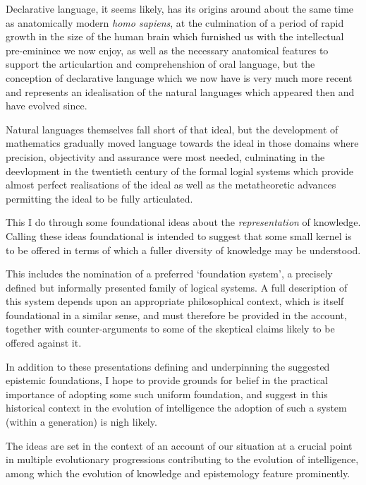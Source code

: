 Declarative language, it seems likely, has its origins around about the same time as anatomically modern \emph{homo sapiens}, at the culmination of a period of rapid growth in the size of the human brain which furnished us with the intellectual pre-eminince we now enjoy, as well as the necessary anatomical features to support the articulartion and comprehenshion of oral language, but the conception of declarative language which we now have is very much more recent and represents an idealisation of the natural languages which appeared then and have evolved since.

Natural languages themselves fall short of that ideal, but the development of mathematics gradually moved language towards the ideal in those domains where precision, objectivity and assurance were most needed, culminating in the deevlopment in the twentieth century of the formal logial systems which provide almost perfect realisations of the ideal as well as the metatheoretic advances permitting the ideal to be fully articulated. 

This I do through some foundational ideas about the \emph{representation} of knowledge.
Calling these ideas foundational is intended to suggest that some small kernel is to be offered in terms of which a fuller diversity of knowledge may be understood.

This includes the nomination of a preferred `foundation system', a precisely defined but informally presented family of logical systems.
A full description of this system depends upon an appropriate philosophical context, which is itself foundational in a similar sense, and must therefore be provided in the account, together with counter-arguments to some of the skeptical claims likely to be offered against it.

In addition to these presentations defining and underpinning the suggested epistemic foundations, I hope to provide grounds for belief in the practical importance of adopting some such uniform foundation, and suggest in this historical context in the evolution of intelligence the adoption of such a system (within a generation) is nigh likely.

The ideas are set in the context of an account of our situation at a crucial point in multiple evolutionary progressions contributing to the evolution of intelligence, among which the evolution of knowledge and epistemology feature prominently.


